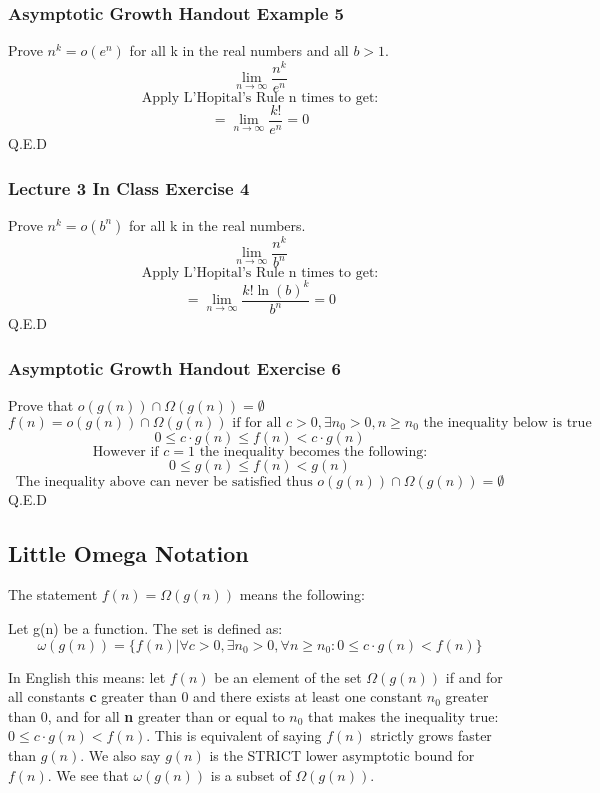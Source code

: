 \documentclass{article}
\begin{document}
\subsubsection{Asymptotic Growth Handout Example 5}
Prove $n^k = o(e^n)$ for all k in the real numbers and all $ b > 1$.
$$\lim_{n \rightarrow \infty} \frac{n^k}{e^n}$$
$$\text{Apply L'Hopital's Rule n times to get:}$$
$$=\lim_{n \rightarrow \infty} \frac{k!}{e^n}=0$$
Q.E.D

\subsubsection{Lecture 3 In Class Exercise 4}
Prove $n^k = o(b^n)$ for all k in the real numbers.
$$\lim_{n \rightarrow \infty} \frac{n^k}{b^n}$$
$$\text{Apply L'Hopital's Rule n times to get:}$$
$$=\lim_{n \rightarrow \infty} \frac{k!\ln{(b)}^k}{b^n}=0$$
Q.E.D

\subsubsection{Asymptotic Growth Handout Exercise 6}
Prove that $o(g(n)) \cap \Omega(g(n)) = \emptyset$
$$f(n) = o(g(n)) \cap \Omega(g(n)) \text{ if for all } c > 0, \exists n_0 > 0, n \geq n_0 \text{ the inequality below is true }$$
$$0 \leq c \cdot g(n) \leq f(n) < c \cdot g(n)$$
$$\text{However if } c = 1 \text{ the inequality becomes the following:}$$
$$0 \leq g(n) \leq f(n)  < g(n)$$
$$\text{The inequality above can never be satisfied thus } o(g(n)) \cap \Omega(g(n)) = \emptyset$$
Q.E.D

\subsection{Little Omega Notation}

The statement $f(n) = \Omega(g(n))$ means the following:

Let g(n) be a function. The set is defined as:
$$ \omega(g(n)) = \{ f(n) | \forall c > 0 , \exists n_0 > 0, \forall n \geq n_0 : 0 \leq c \cdot g(n) < f(n) \}$$ 

In English this means: let $f(n)$ be an element of the set $\Omega(g(n))$ if and for all constants \textbf{c} greater than 0 and there exists at least one constant \textbf{$n_0$} greater than 0, and for all \textbf{n} greater than or equal to \textbf{$n_0$} that makes the inequality true: $0 \leq c \cdot g(n) < f(n)$. This is equivalent of saying $f(n)$ strictly grows faster than $g(n)$. We also say $g(n)$ is the STRICT lower asymptotic bound for $f(n)$. We see that $\omega(g(n))$ is a subset of $\Omega(g(n))$.
\end{document}
